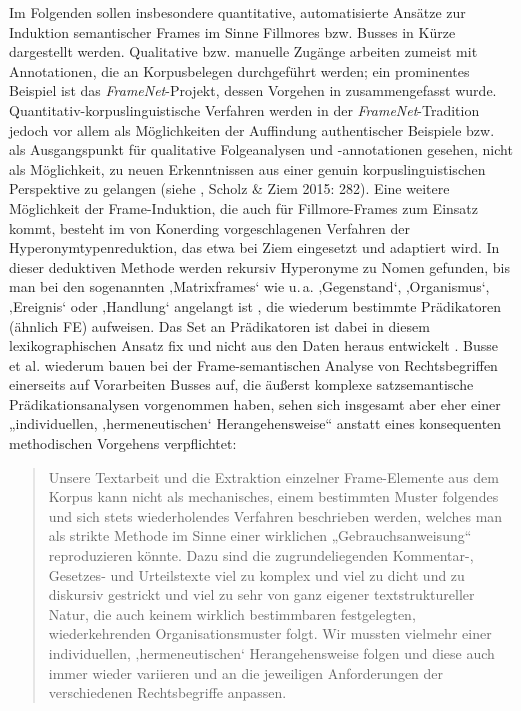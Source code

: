 Im Folgenden sollen insbesondere quantitative, automatisierte Ansätze zur Induktion semantischer Frames im Sinne Fillmores bzw. Busses in Kürze dargestellt werden. Qualitative bzw. manuelle Zugänge arbeiten zumeist mit Annotationen, die an Korpusbelegen durchgeführt werden; ein prominentes Beispiel ist das \emph{FrameNet}-Projekt, dessen Vorgehen in  zusammengefasst wurde. Quantitativ-korpuslinguistische Verfahren werden in der \emph{FrameNet}-Tradition jedoch vor allem als Möglichkeiten der Auffindung authentischer Beispiele bzw. als Ausgangspunkt für qualitative Folgeanalysen und -annotationen gesehen, nicht als Möglichkeit, zu neuen Erkenntnissen aus einer genuin korpuslinguistischen Perspektive zu gelangen (siehe , Scholz \& Ziem 2015: 282). Eine weitere Möglichkeit der Frame-Induktion, die auch für Fillmore-Frames zum Einsatz kommt, besteht im von Konerding \autocite*{konerdingFramesUndLexikalisches1993} vorgeschlagenen Verfahren der Hyperonymtypenreduktion, das etwa bei Ziem \autocite*{ziemFramesUndSprachliches2008} eingesetzt und adaptiert wird. In dieser deduktiven Methode werden rekursiv Hyperonyme zu Nomen gefunden, bis man bei den sogenannten ‚Matrixframes` wie u.\,a. ‚Gegenstand`, ‚Organismus`, ‚Ereignis` oder ‚Handlung` angelangt ist \autocite[182]{konerdingFramesUndLexikalisches1993}, die wiederum bestimmte Prädikatoren (ähnlich FE) aufweisen. Das Set an Prädikatoren ist dabei in diesem lexikographischen Ansatz fix und nicht aus den Daten heraus entwickelt \autocite[siehe auch][300-303]{scholzVokabularImDiskurshistorischen2015}. Busse et al. \autocite*{busseBedeutungsUndBegriffswissen2018} wiederum bauen bei der Frame-semantischen Analyse von Rechtsbegriffen einerseits auf Vorarbeiten Busses auf, die äußerst komplexe satzsemantische Prädikationsanalysen \autocite{vonpolenzDeutscheSatzsemantikGrundbegriffe1985} vorgenommen haben, sehen sich insgesamt aber eher einer „individuellen, ‚hermeneutischen` Herangehensweise`` anstatt eines konsequenten methodischen Vorgehens verpflichtet:

\begin{quote}
Unsere Textarbeit und die Extraktion einzelner Frame-Elemente aus dem Korpus kann nicht als mechanisches, einem bestimmten Muster folgendes und sich stets wiederholendes Verfahren beschrieben werden, welches man als strikte Methode im Sinne einer wirklichen „Gebrauchsanweisung`` reproduzieren könnte. Dazu sind die zugrundeliegenden Kommentar-, Gesetzes- und Urteilstexte viel zu komplex und viel zu dicht und zu diskursiv gestrickt und viel zu sehr von ganz eigener textstruktureller Natur, die auch keinem wirklich bestimmbaren festgelegten, wiederkehrenden Organisationsmuster folgt. Wir mussten vielmehr einer individuellen, ‚hermeneutischen` Herangehensweise folgen und diese auch immer wieder variieren und an die jeweiligen Anforderungen der verschiedenen Rechtsbegriffe anpassen. \autocite[91]{busseBedeutungsUndBegriffswissen2018}
\end{quote}

